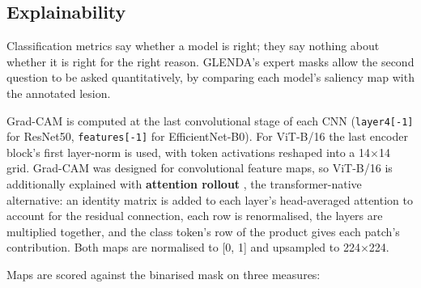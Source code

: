 \documentclass[preprint,12pt]{elsarticle}
\begin{document}
\subsection{Explainability}
\label{sec:explainability}

Classification metrics say whether a model is right; they say nothing about whether it is right for the right reason. GLENDA's expert masks allow the second question to be asked quantitatively, by comparing each model's saliency map with the annotated lesion.

Grad-CAM \cite{ref_gradcam} is computed at the last convolutional stage of each CNN (\texttt{layer4[-1]} for ResNet50, \texttt{features[-1]} for EfficientNet-B0). For ViT-B/16 the last encoder block's first layer-norm is used, with token activations reshaped into a 14$\times$14 grid. Grad-CAM was designed for convolutional feature maps, so ViT-B/16 is additionally explained with \textbf{attention rollout} \cite{ref_rollout}, the transformer-native alternative: an identity matrix is added to each layer's head-averaged attention to account for the residual connection, each row is renormalised, the layers are multiplied together, and the class token's row of the product gives each patch's contribution. Both maps are normalised to [0, 1] and upsampled to 224$\times$224.

Maps are scored against the binarised mask on three measures:
\end{document}
